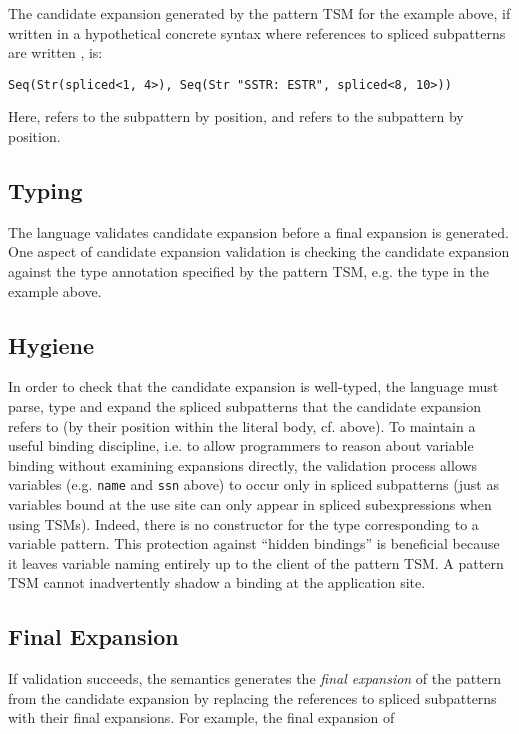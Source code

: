 {{{The candidate expansion generated by the pattern TSM  for the example above, if written in a hypothetical concrete syntax where references to spliced subpatterns are written , is:
\begin{lstlisting}[numbers=none]
Seq(Str(spliced<1, 4>), Seq(Str "SSTR: ESTR", spliced<8, 10>))
\end{lstlisting}
Here,  refers to the subpattern  by position, and  refers to the subpattern  by position.

\subsection{Typing}\label{sec:ptsms-validation}
The language validates candidate expansion before a final expansion is generated. One aspect of candidate expansion validation is checking the candidate expansion against the type annotation specified by the pattern TSM, e.g. the type  in the example above.

\subsection{Hygiene}\label{sec:ptsms-hygiene}
In order to check that the candidate expansion is well-typed, the language must parse, type and expand the spliced subpatterns that the candidate expansion refers to (by their position within the literal body, cf. above). To maintain a useful binding discipline, i.e. to allow programmers to reason about variable binding without examining expansions directly, the validation process allows variables (e.g. \lstinline{name} and \lstinline{ssn} above) to occur only in spliced subpatterns (just as variables bound at the use site can only appear in spliced subexpressions when using TSMs). Indeed, there is no constructor for the type  corresponding to a variable pattern. This protection against ``hidden bindings'' is beneficial because it leaves variable naming entirely up to the client of the pattern TSM. A pattern TSM cannot inadvertently shadow a binding at the application site.

\subsection{Final Expansion}\label{sec:ptsms-final-expansion}
If validation succeeds, the semantics generates the \emph{final expansion} of the pattern from the candidate expansion by replacing the references to spliced subpatterns with their final expansions. For example, the final expansion of \li{#\dolla#rx /SURL@EURLnameSURL: %
\begin{lstlisting}[numbers=none]
Seq(Str(name), Seq(Str "SSTR: ESTR", ssn))
\end{lstlisting}

}}}}
